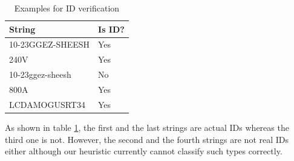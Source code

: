 \begin{table}[H]
	\centering
	\begin{tabular}{|p{}|p{}|}
		\hline
		\textbf{String} & \textbf{Is ID?} \\
		\hline
		10-23GGEZ-SHEESH & Yes \\
		\hline
		240V & Yes \\
		\hline
		10-23ggez-sheesh & No \\
		\hline
		800A & Yes \\
		\hline
		LCDAMOGUSRT34 & Yes \\
		\hline
	\end{tabular}
	\caption{Examples for ID verification}
	\label{tab:tests_id}
\end{table}

As shown in table \ref{tab:tests_id}, the first and the last strings are actual IDs whereas the third 
one is not. However, the second and the fourth strings are not real IDs either although our heuristic 
currently cannot classify such types correctly.



